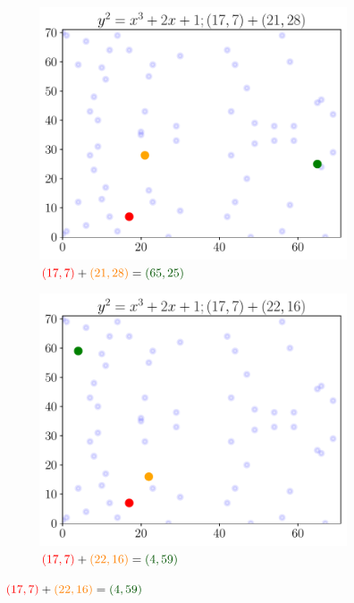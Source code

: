 \begin{figure}[p]
    \begin{subfigure}[t]{0.45\textwidth}
    \includegraphics[width=\textwidth]{plots/ec_finite/ec_finite_F_71_2_1_addition_21_28.pdf}
    \caption{$\textcolor{red}{\parens{17,7}}
        + \textcolor{orange}{\parens{21,28}}
        = \textcolor[rgb]{0,0.33,0}{\parens{65,25}}$}
    \end{subfigure}
    \begin{subfigure}[t]{0.45\textwidth}
    \includegraphics[width=\textwidth]{plots/ec_finite/ec_finite_F_71_2_1_addition_22_16.pdf}
    \caption{$\textcolor{red}{\parens{17,7}}
        + \textcolor{orange}{\parens{22,16}}
        = \textcolor[rgb]{0,0.33,0}{\parens{4,59}}$}
    \end{subfigure}


\end{figure}
